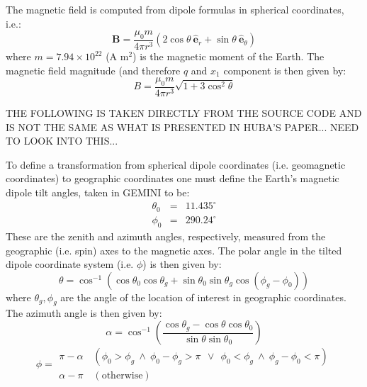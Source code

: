 \documentclass[11pt,letterpaper]{article}
\begin{document}
The magnetic field is computed from dipole formulas in spherical coordinates, i.e.:  
\begin{equation}
\mathbf{B}=\frac{\mu_0 m}{4 \pi r^3} \left(2 \cos \theta ~ \hat{\mathbf{e}}_r + \sin \theta ~ \hat{\mathbf{e}}_\theta \right)
\end{equation}
where $m=7.94 \times 10^{22}$ (A m$^2$) is the magnetic moment of the Earth.  The magnetic field magnitude (and therefore $q$ and $x_1$ component is then given by:  
\begin{equation}
B=\frac{\mu_0 m}{4 \pi r^3} \sqrt{1+3 \cos^2 \theta}
\end{equation}

THE FOLLOWING IS TAKEN DIRECTLY FROM THE SOURCE CODE AND IS NOT THE SAME AS WHAT IS PRESENTED IN HUBA'S PAPER...  NEED TO LOOK INTO THIS...

To define a transformation from spherical dipole coordinates (i.e. geomagnetic coordinates) to geographic coordinates one must define the Earth's magnetic dipole tilt angles, taken in GEMINI to be:  
\begin{eqnarray}
\theta_0 &=& 11.435^\circ \nonumber \\
\phi_0 &=& 290.24^\circ \nonumber
\end{eqnarray}
These are the zenith and azimuth angles, respectively, measured from the geographic (i.e. spin) axes to the magnetic axes.  The polar angle in the tilted dipole coordinate system (i.e. $\phi$) is then given by:
\begin{equation}
\theta = \cos^{-1} \left( \cos \theta_0 \cos \theta_g + \sin \theta_0 \sin \theta_g \cos \left( \phi_g - \phi_0 \right) \right)
\end{equation}
where $\theta_g,\phi_g$ are the angle of the location of interest in geographic coordinates.  The azimuth angle is then given by:  
\begin{equation}
\alpha = \cos^{-1} \left( \frac{ \cos \theta_g - \cos \theta \cos \theta_0 }{\sin \theta \sin \theta_0} \right)
\end{equation} 
\begin{equation}
\phi= 
\begin{array}{c}
\pi - \alpha \quad (\phi_0 > \phi_g ~\land~ \phi_0-\phi_g > \pi ~~\lor~~ \phi_0 < \phi_g ~\land~ \phi_g - \phi_0 < \pi) \\
\alpha - \pi \quad (\mathrm{otherwise})
\end{array}
\end{equation}
\end{document}
